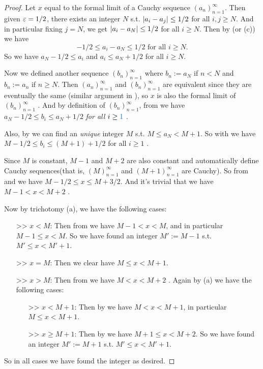\begin{proof}
Let \(x\) equal to the formal limit of a Cauchy sequence \((a_n)_{n = 1}^{\infty}\).
Then given \(\varepsilon = 1/2\), there exists an integer \(N\) s.t. \(\lvert a_i - a_j\rvert \le 1/2\) for all \(i, j \ge N\).
And in particular fixing \(j = N\), we get \(\lvert a_i - a_N\rvert \le 1/2\) for all \(i \ge N\).
Then by  (or (c)) we have
\[
    -1/2 \le a_i - a_N \le 1/2 \text{ for all } i \ge N.
\]
So we have \(a_N - 1/2 \le a_i\)  and \(a_i \le a_N + 1/2\)  for all \(i \ge N\).

Now we defined another sequence \((b_n)_{n = 1}^{\infty}\) where \(b_n := a_N\) if \(n < N\) and \(b_n := a_n\) if \(n \ge N\).
Then \((a_n)_{n = 1}^{\infty}\) and \((b_n)_{n = 1}^{\infty}\) are equivalent since they are eventually the same
(similar argument in ),
so \(x\) is also the formal limit of \((b_n)_{n = 1}^{\infty}\) .
And by definition of \((b_n)_{n = 1}^{\infty}\), from  we have \(a_N - 1/2 \le b_i \le a_N + 1/2\) \emph{for all \(i \ge \BLUE{1}\)} .

Also, by  we can find an \emph{unique} integer \(M\) s.t. \(M \le a_N < M + 1\).
So with  we have \(M - 1/2 \le b_i \le (M + 1) + 1/2\) for all \(i \ge 1\) .

Since \(M\) is constant, \(M - 1\) and \(M + 2\) are also constant and automatically define Cauchy sequences(that is, \((M)_{n = 1}^{\infty}\) and \((M + 1)_{n = 1}^{\infty}\) are Cauchy).
So from  and  we have \(M - 1/2 \le x \le M + 3/2\).
And it's trivial that we have \(M - 1 < x < M + 2\) .

Now by trichotomy (a), we have the following cases:
\begin{itemize}
    \item[>>] \(x < M\):
        Then from  we have \(M - 1 < x < M\), and in particular \(M - 1 \le x < M\).
        So we have found an integer \(M' := M - 1\) s.t. \(M' \le x < M' + 1\).
    \item[>>] \(x = M\):
        Then we clear have \(M \le x < M + 1\).
    \item[>>] \(x > M\):
        Then from  we have \(M < x < M + 2\) .
        Again by (a) we have the following cases:
        \begin{itemize}
            \item[>>] \(x < M + 1\):
                Then by  we have \(M < x < M + 1\), in particular \(M \le x < M + 1\).
            \item[>>] \(x \ge M + 1\):
                Then by  we have \(M + 1 \le x < M + 2\).
                So we have found an integer \(M' := M + 1\) s.t. \(M' \le x < M' + 1\).
        \end{itemize}
\end{itemize}
So in all cases we have found the integer as desired.


\end{proof}
